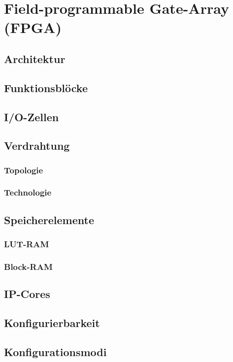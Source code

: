 \chapter{Field-programmable Gate-Array (FPGA)}

\section{Architektur}

\section{Funktionsblöcke}

\section{I/O-Zellen}

\section{Verdrahtung}
\subsection{Topologie}
\subsection{Technologie}

\section{Speicherelemente}
\subsection{LUT-RAM}
\subsection{Block-RAM}

\section{IP-Cores}

\section{Konfigurierbarkeit}

\section{Konfigurationsmodi}
